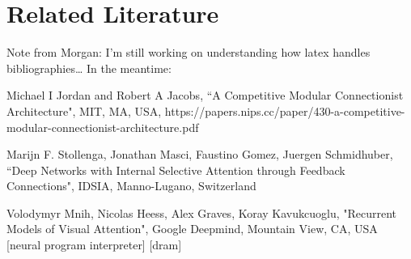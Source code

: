 \documentclass[12pt]{article}
\begin{document}
\section{Related Literature}\label{Related Literature // Bibliography}



Note from Morgan: I'm still working on understanding how latex handles bibliographies\ldots
In the meantime: 
\par Michael I Jordan and Robert A Jacobs, ``A Competitive Modular Connectionist Architecture", MIT, MA, USA, https://papers.nips.cc/paper/430-a-competitive-modular-connectionist-architecture.pdf
\par Marijn F. Stollenga, Jonathan Masci, Faustino Gomez, Juergen Schmidhuber, ``Deep Networks with Internal Selective Attention through Feedback Connections", IDSIA, Manno-Lugano, Switzerland
\par Volodymyr Mnih, Nicolas Heess, Alex Graves, Koray Kavukcuoglu, "Recurrent Models of Visual Attention", Google Deepmind, Mountain View, CA, USA
[neural program interpreter]
[dram]
\end{document}
